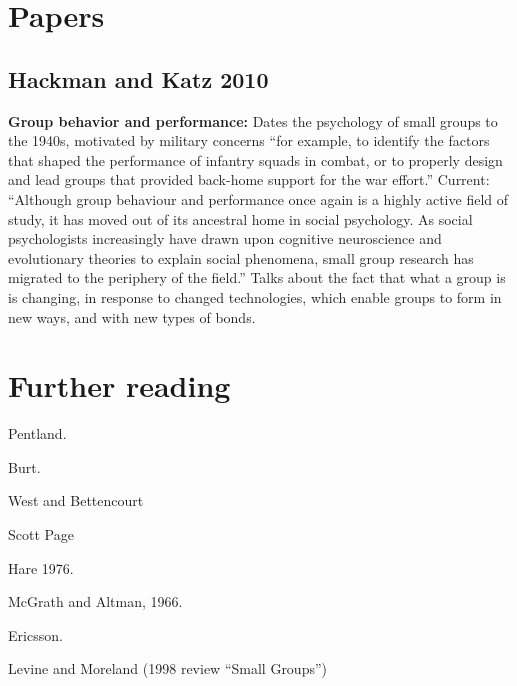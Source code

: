 
\chapter{Papers}

\section{Hackman and Katz 2010}

\textbf{Group behavior and performance:} Dates the psychology of small
groups to the 1940s, motivated by military concerns ``for example, to
identify the factors that shaped the performance of infantry squads in
combat, or to properly design and lead groups that provided back-home
support for the war effort.''  Current: ``Although group behaviour and
performance once again is a highly active field of study, it has moved
out of its ancestral home in social psychology.  As social
psychologists increasingly have drawn upon cognitive neuroscience and
evolutionary theories to explain social phenomena, small group
research has migrated to the periphery of the field.''  Talks about
the fact that what a group is is changing, in response to changed
technologies, which enable groups to form in new ways, and with new
types of bonds.





\chapter{Further reading}

Pentland.

Burt.

West and Bettencourt

Scott Page

Hare 1976.

McGrath and Altman, 1966.

Ericsson.

Levine and Moreland (1998 review ``Small Groups'')